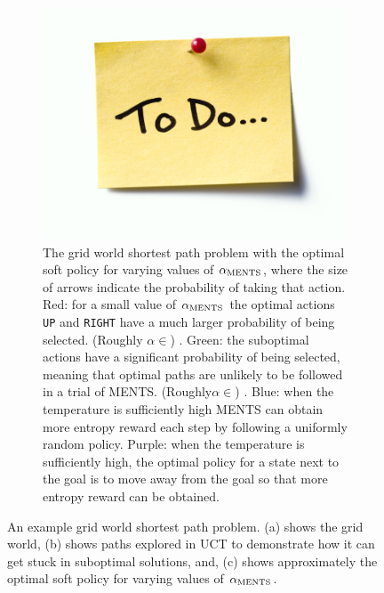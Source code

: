 \begin{figure}
\begin{subfigure}[b]{0.32\textwidth}
            \label{fig:4:shortest_path_intro_b}
        \end{subfigure}
        \hfill
        \begin{subfigure}[b]{0.32\textwidth}
            \centering
            \includegraphics[width=\textwidth]{figures/todo.jpg}
            \caption{The grid world shortest path problem with the optimal soft policy for varying values of ${\alpha_{{\textnormal{MENTS}}}}$, where the size of arrows indicate the probability of taking that action. Red: for a small value of ${\alpha_{{\textnormal{MENTS}}}}$ the optimal actions \texttt{UP} and \texttt{RIGHT} have a much larger probability of being selected. (Roughly $\alpha \in $) . Green: the suboptimal actions have a significant probability of being selected, meaning that optimal paths are unlikely to be followed in a trial of MENTS. (Roughly$\alpha \in $) . Blue: when the temperature is sufficiently high MENTS can obtain more entropy reward each step by following a uniformly random policy. Purple: when the temperature is sufficiently high, the optimal policy for a state next to the goal is to move away from the goal so that more entropy reward can be obtained.}
            \label{fig:4:shortest_path_intro_c}
        \end{subfigure}
        \caption[An example grid world shortest path problem.]{An example grid world shortest path problem. (a) shows the grid world, (b) shows paths explored in UCT to demonstrate how it can get stuck in suboptimal solutions, and, (c) shows approximately the optimal soft policy for varying values of ${\alpha_{{\textnormal{MENTS}}}}$.}
        \label{fig:4:shortest_path_intro}
    \end{figure}
    
